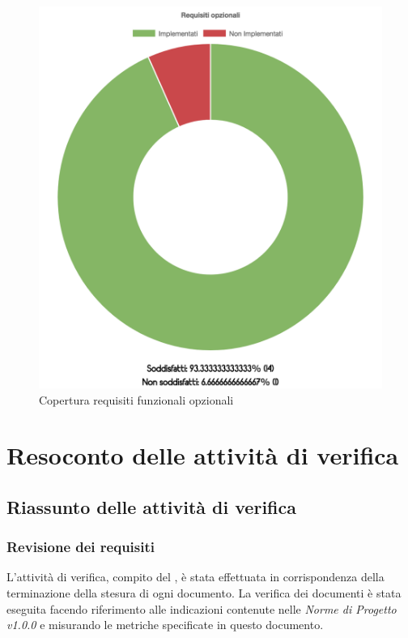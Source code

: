 \begin{figure}[H]
	\centering
	\includegraphics[scale = 0.2]{Images/opzionali.png}
	\caption{Copertura requisiti funzionali opzionali}
	\label{img:seqGraph}
\end{figure}

\clearpage


\section{Resoconto delle attività di verifica}
	\subsection{Riassunto delle attività di verifica}
	\subsubsection{Revisione dei requisiti}
	L'attività di verifica, compito del \emph{}, è stata effettuata in corrispondenza della terminazione della stesura di ogni documento. La verifica dei documenti è stata eseguita facendo riferimento alle indicazioni contenute nelle \emph{Norme di Progetto v1.0.0} e misurando le metriche specificate in questo documento.
